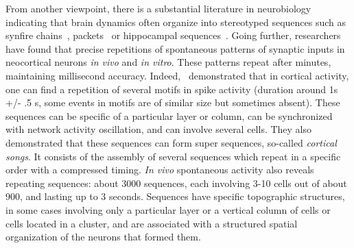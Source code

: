 \documentclass[brainsci, %
               review,submit,pdftex,moreauthors
               ]{Definitions/mdpi}
\begin{document}
From another viewpoint, there is a substantial literature in neurobiology indicating that brain dynamics often organize into stereotyped sequences such as synfire chains~\citep{ikegaya_synfire_2004}, packets~\citep{luczak_sequential_2007} or hippocampal sequences~\citep{pastalkova_internally_2008}. %
Going further, researchers have found that  precise repetitions of spontaneous patterns of synaptic inputs in neocortical neurons \textit{in vivo} and \textit{in vitro}. These patterns repeat after minutes, maintaining millisecond accuracy. Indeed,~\citet{ikegaya_synfire_2004} demonstrated that in cortical activity, one can find a repetition of several motifs in spike activity (duration around 1s +/- .5 s, some events in motifs are of similar size but sometimes absent). These sequences can be specific of a particular layer or column, can be synchronized with network activity oscillation, and can involve several cells. They also demonstrated that these sequences can form super sequences, so-called \emph{cortical songs}. It consists of the assembly of several sequences which repeat in a specific order with a compressed timing. \emph{In vivo} spontaneous activity also reveals repeating sequences: about 3000 sequences, each involving 3-10 cells out of about 900, and lasting up to 3 seconds. Sequences have specific topographic structures, in some cases involving only a particular layer or a vertical column of cells or cells located in a cluster, and are associated with a structured spatial organization of the neurons that formed them. %
\end{document}
